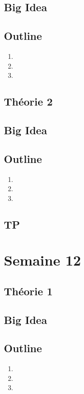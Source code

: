 \documentclass{article}
\begin{document}
\subsection*{Big Idea}
\subsection*{Outline}
\begin{enumerate}
    \item
    \item
    \item
\end{enumerate}
\subsection{Théorie 2}
\subsection*{Big Idea}
\subsection*{Outline}
\begin{enumerate}
    \item
    \item
    \item
\end{enumerate}
\subsection{TP}

\pagebreak
\section{Semaine 12}
\subsection{Théorie 1}
\subsection*{Big Idea}
\subsection*{Outline}
\begin{enumerate}
    \item
    \item
    \item
\end{enumerate}
\end{document}
